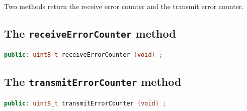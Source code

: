 \documentclass[10pt, a4paper, obeyspaces, openany]{extarticle}
\begin{document}
Two methods return the receive error counter and the transmit error counter.



\subsection{The \texttt{receiveErrorCounter} method}

{ \small\begin{lstlisting}[language=c++]
public: uint8_t receiveErrorCounter (void) ;
\end{lstlisting}}



\subsection{The \texttt{transmitErrorCounter} method}

{ \small\begin{lstlisting}[language=c++]
public: uint8_t transmitErrorCounter (void) ;
\end{lstlisting}}
\end{document}
